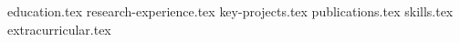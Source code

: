 \documentclass[11pt, a4paper]{awesome-cv}
\newcommand*{\sectiondir}{cv/}
\begin{document}
\makecvheader

{education.tex}
{research-experience.tex}
{key-projects.tex}
{publications.tex}
{skills.tex}
{extracurricular.tex}
\end{document}
